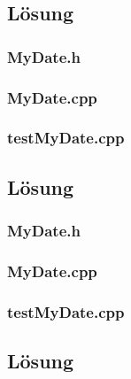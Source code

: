 \setcounter{section}{1}
\setcounter{subsection}{0}

\subsection{Lösung}
\subsubsection{MyDate.h}

\subsubsection{MyDate.cpp}

\subsubsection{testMyDate.cpp}


\setcounter{section}{2}
\setcounter{subsection}{1}

\subsection{Lösung}
\subsubsection{MyDate.h}

\subsubsection{MyDate.cpp}

\subsubsection{testMyDate.cpp}


\setcounter{section}{3}
\setcounter{subsection}{1}


\setcounter{section}{4}
\setcounter{subsection}{1}
\setcounter{subsubsection}{1}

\subsection{Lösung}
